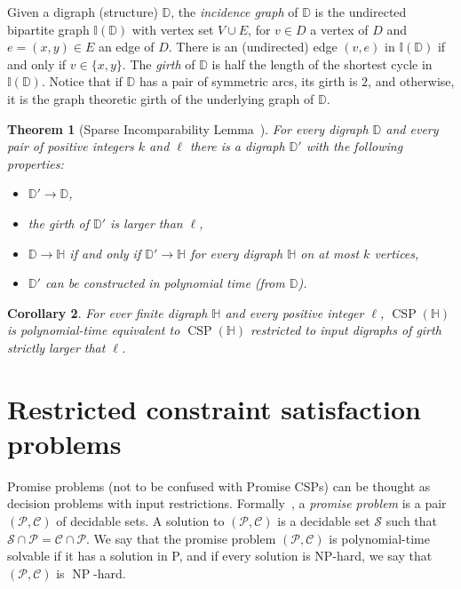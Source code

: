 \documentclass{article}
\newtheorem{theorem}{Theorem}
\newtheorem{corollary}[theorem]{Corollary}
\theoremstyle{definition}
\theoremstyle{remark}
\DeclareMathOperator{\NP}{NP}
\DeclareMathOperator{\CSP}{CSP}
\newcommand{\bD}{{\mathbb D}}
\newcommand{\bH}{{\mathbb H}}
\newcommand{\bI}{{\mathbb I}}
\newcommand{\calC}{{\mathcal C}}
\newcommand{\calS}{{\mathcal S}}
\newcommand{\calP}{{\mathcal P}}
\begin{document}
Given a digraph (structure) $\bD$, the \emph{incidence graph} of $\bD$ is the undirected
bipartite graph $\bI(\bD)$ with vertex set $V\cup E$, for $v\in D$ a vertex of $D$ and $e =(x,y)\in E$ an edge of $D$. There is an (undirected) edge $(v,e)$ in $\bI(\bD)$ if and only if $v \in\{x,y\}$. The \emph{girth}
of $\bD$ is half the length of the shortest cycle in $\bI(\bD)$. Notice that if $\bD$ has a pair of symmetric
arcs, its girth is $2$, and otherwise, it is the graph theoretic girth of the underlying graph of $\bD$.


\begin{theorem}[Sparse Incomparability Lemma~\cite{Kun}]\label{thm:sparse-incomparability}
For every digraph $\bD$ and every pair of positive integers $k$ and $\ell$ there is a 
digraph $\bD'$ with the following properties:
\begin{itemize}[itemsep = 1.2pt]
    \item $\bD'\to \bD$,
    \item the girth of $\bD'$ is larger than $\ell$,  
    \item $\bD\to \bH$ if and only if $\bD'\to \bH$ for every digraph $\bH$ on
    at most $k$ vertices,
    \item $\bD'$ can be constructed in polynomial time (from $\bD$). 
\end{itemize}
\end{theorem}


\begin{corollary}\label{cor:large-girth}
    For ever finite digraph $\bH$ and every positive integer $\ell$, 
    $\CSP(\bH)$ is polynomial-time equivalent to $\CSP(\bH)$ restricted to input digraphs of girth strictly larger
    that $\ell$.
\end{corollary} 




\section{Restricted constraint satisfaction problems}
\label{sect:RCSPs}

Promise problems (not to be confused with Promise CSPs) can be thought as decision problems with input restrictions. Formally~\cite{selmanIC78},
a \emph{promise problem} is a pair $(\calP,\calC)$ of decidable sets. A solution to $(\calP,\calC)$ is a decidable
set $\calS$ such that $\calS\cap \calP = \calC\cap \calP$. We say that the promise problem $(\calP,\calC)$
is polynomial-time solvable if it has a solution in P, and if every solution is NP-hard, we say
that $(\calP,\calC)$ is $\NP$-hard. 
\end{document}
